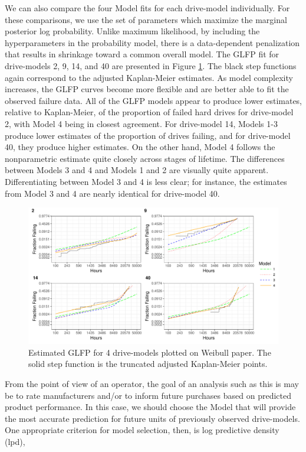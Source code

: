 \documentclass[12pt]{article}
\begin{document}
We can also compare the four Model fits for each drive-model individually.  For these comparisons, we use the set of parameters which maximize the marginal posterior log probability. Unlike maximum likelihood, by including the hyperparameters in the probability model, there is a data-dependent penalization that results in shrinkage toward a common overall model. The GLFP fit for drive-models 2, 9, 14, and 40 are presented in Figure \ref{fig:mod_comp_leg}.  The black step functions again correspond to the adjusted Kaplan-Meier estimates.  As model complexity increases, the GLFP curves become more flexible and are better able to fit the observed failure data.  All of the GLFP models appear to produce lower estimates, relative to Kaplan-Meier, of the proportion of failed hard drives for drive-model 2, with Model 4 being in closest agreement.  For drive-model 14, Models 1-3 produce lower estimates of the proportion of drives failing, and for drive-model 40, they produce higher estimates.  On the other hand, Model 4 follows the nonparametric estimate quite closely across stages of lifetime.  The differences between Models 3 and 4 and Models 1 and 2 are visually quite apparent.  Differentiating between Model 3 and 4 is less clear; for instance, the estimates from Model 3 and 4 are nearly identical for drive-model 40.
\begin{figure}[H]
    \centering
   \includegraphics[width=\textwidth]{mod_compare_legend}
		\caption{Estimated GLFP for 4 drive-models plotted on Weibull paper.  The solid step function is the truncated adjusted Kaplan-Meier points.  \label{fig:mod_comp_leg}} 
\end{figure}


From the point of view of an operator, the goal of an analysis such as this is may be to rate manufacturers and/or to inform future purchases based on predicted product performance. In this case, we should choose the Model that will provide the most accurate prediction for future units of previously observed drive-models. One appropriate criterion for model selection, then, is log predictive density (lpd),
\end{document}
